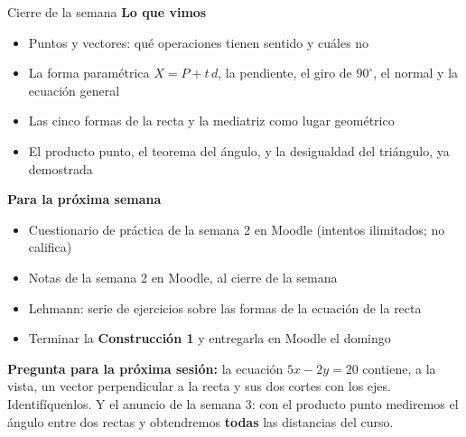 \documentclass[aspectratio=169,10pt]{beamer}
\newcommand{\destaca}[1]{%
  \par\vspace{3pt}\noindent
  \colorbox{turquesaClaro}{%
    \parbox{\dimexpr\linewidth-2\fboxsep\relax}{\vspace{3pt}#1\vspace{3pt}}}%
  \par\vspace{3pt}}
\begin{document}
\begin{frame}{Cierre de la semana}
  \textbf{Lo que vimos}
  {\small
  \begin{itemize}
    \item Puntos y vectores: qué operaciones tienen sentido y cuáles no
    \item La forma paramétrica $X=P+t\,d$, la pendiente, el giro de
      $90^\circ$, el normal y la ecuación general
    \item Las cinco formas de la recta y la mediatriz como lugar
      geométrico
    \item El producto punto, el teorema del ángulo, y la desigualdad
      del triángulo, ya demostrada
  \end{itemize}}

  \vspace{0.2cm}
  \textbf{Para la próxima semana}
  {\small
  \begin{itemize}
    \item Cuestionario de práctica de la semana 2 en Moodle
      (intentos ilimitados; no califica)
    \item Notas de la semana 2 en Moodle, al cierre de la semana
    \item Lehmann: serie de ejercicios sobre las formas de la ecuación
      de la recta
    \item Terminar la \textbf{Construcción 1} y entregarla en Moodle
      el domingo
  \end{itemize}}

  \vspace{0.2cm}
  \destaca{\textbf{Pregunta para la próxima sesión:} la ecuación
  $5x-2y=20$ contiene, a la vista, un vector perpendicular a la recta
  y sus dos cortes con los ejes. Identifíquenlos. Y el anuncio de la
  semana 3: con el producto punto mediremos el ángulo entre dos rectas
  y obtendremos \textbf{todas} las distancias del curso.}
\end{frame}
\end{document}
